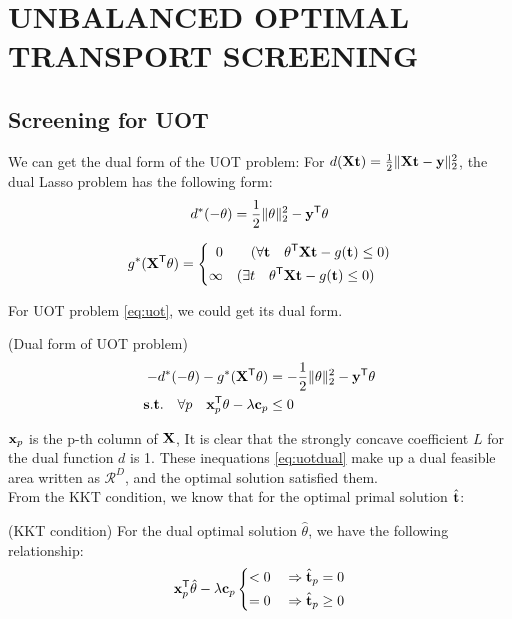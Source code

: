 \section{UNBALANCED OPTIMAL TRANSPORT SCREENING}
\subsection{Screening for UOT}

We can get the dual form of the UOT problem: 
For $d(\mathbf{X} \mathbf t) = \frac{1}{2}\|\mathbf{X} \mathbf t-\mathbf y\|_2^2$, the dual Lasso problem has the following form:
 \begin{equation}
\begin{split} 
d^*(-\theta) = \frac{1}{2}\|\theta\|_2^2-\mathbf y^{\mathsf T}\theta
 \end{split}
\end{equation}

 \begin{equation}
\begin{split} 
g^*(\mathbf{X}^{\mathsf T}\theta) = \left\{
\begin{aligned}
0 \quad&\quad ( \forall \mathbf t \quad\theta^{\mathsf T}\mathbf{X}\mathbf t - g(\mathbf t) \leq 0 )\\
\infty \quad&( \exists t \quad\theta^{\mathsf T}\mathbf{X}\mathbf t - g(\mathbf t) \leq 0 )
\end{aligned}
\right.
 \end{split}
\end{equation}

For UOT problem \ref{eq:uot}, we could get its dual form. 
\begin{lem}(Dual form of UOT problem)
\begin{equation}
\begin{split}
-d^*(-\theta) - g^*(\mathbf{X}^{\mathsf T}\theta)& = -\frac{1}{2}\|\theta\|_2^2-\mathbf y^{\mathsf T}\theta \\
 \mathbf{s.t.} \quad \forall p \quad \mathbf{x}_p^{\mathsf T}\theta -\lambda \mathbf c_p &\leq 0
 \end{split}
 \label{eq:uotdual}
\end{equation}
\end{lem}
$\mathbf{x}_p $ is the p-th column of $\mathbf{X}$, It is clear that the strongly concave coefficient $L$ for the dual function $d$ is 1. These inequations \ref{eq:uotdual} make up a dual feasible area written as $\mathcal{R}^{D}$, and the optimal solution satisfied them.\\
From the KKT condition, we know that for the optimal primal solution $\hat{\mathbf t}$:
\begin{thm} (KKT condition) For the dual optimal solution $\hat{\theta}$, we have the following relationship:
 \begin{equation}
\begin{split}
\mathbf{x}_p^{\mathsf T}\hat{\theta} -\lambda \mathbf c_p \left\{
\begin{aligned}
< 0 \quad& \Rightarrow \hat{\mathbf t}_p = 0\\
= 0 \quad& \Rightarrow \hat{\mathbf t}_p \geq 0
\end{aligned}
\right.
 \end{split}
 \label{eq:kkt}
\end{equation}
\end{thm}

